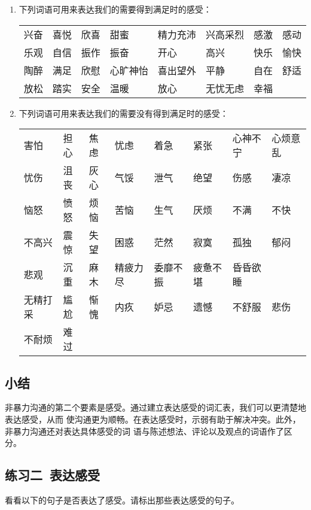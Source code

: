 \documentclass{ctexart}
\begin{document}
\begin{enumerate}[label=(\arabic*)]
	\item 下列词语可用来表达我们的需要得到满足时的感受：

	      \begin{tabular}{llllllll}
		      兴奋 & 喜悦 & 欣喜 & 甜蜜   & 精力充沛 & 兴高采烈 & 感激 & 感动 \\
		      乐观 & 自信 & 振作 & 振奋   & 开心   & 高兴   & 快乐 & 愉快 \\
		      陶醉 & 满足 & 欣慰 & 心旷神怡 & 喜出望外 & 平静   & 自在 & 舒适 \\
		      放松 & 踏实 & 安全 & 温暖   & 放心   & 无忧无虑 & 幸福 &
	      \end{tabular}
	\item 下列词语可用来表达我们的需要没有得到满足时的感受：

	      \begin{tabular}{llllllll}
		      害怕   & 担心 & 焦虑 & 忧虑   & 着急   & 紧张   & 心神不宁 & 心烦意乱 \\
		      忧伤   & 沮丧 & 灰心 & 气馁   & 泄气   & 绝望   & 伤感   & 凄凉   \\
		      恼怒   & 愤怒 & 烦恼 & 苦恼   & 生气   & 厌烦   & 不满   & 不快   \\
		      不高兴  & 震惊 & 失望 & 困惑   & 茫然   & 寂寞   & 孤独   & 郁闷   \\
		      悲观   & 沉重 & 麻木 & 精疲力尽 & 委靡不振 & 疲惫不堪 & 昏昏欲睡        \\
		      无精打采 & 尴尬 & 惭愧 & 内疚   & 妒忌   & 遗憾   & 不舒服  & 悲伤   \\
		      不耐烦  & 难过
	      \end{tabular}
\end{enumerate}

\subsection{小结}

非暴力沟通的第二个要素是感受。通过建立表达感受的词汇表，我们可以更清楚地表达感受，从而
使沟通更为顺畅。在表达感受时，示弱有助于解决冲突。此外，非暴力沟通还对表达具体感受的词
语与陈述想法、评论以及观点的词语作了区分。

\subsection{练习二\ 表达感受}

看看以下的句子是否表达了感受。请标出那些表达感受的句子。
\end{document}

